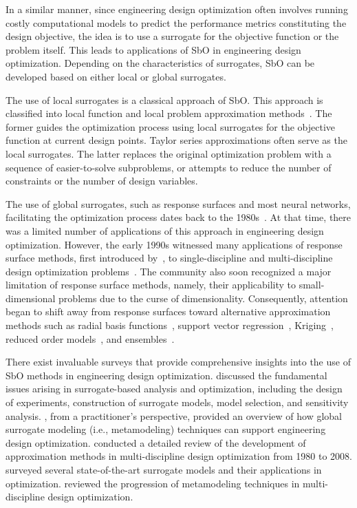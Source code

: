 \documentclass[journal ]{new-aiaa}
\begin{document}
	In a similar manner, since engineering design optimization often involves running costly computational models to predict the performance metrics constituting the design objective, the idea is to use a surrogate for the objective function or the problem itself.
	This leads to applications of SbO in engineering design optimization.
	Depending on the characteristics of surrogates, SbO can be developed based on either local or global surrogates.
	
	The use of local surrogates is a classical approach of SbO.
	This approach is classified into local function and local problem approximation methods~\citep{Barthelemy1993}.
	The former guides the optimization process using local surrogates for the objective function at current design points.
	Taylor series approximations often serve as the local surrogates.
	The latter replaces the original optimization problem with a sequence of easier-to-solve subproblems, or attempts to reduce the number of constraints or the number of design variables.
	
	The use of global surrogates, such as response surfaces and most neural networks, facilitating the optimization process dates back to the 1980s~\citep{Barthelemy1993}.
	At that time, there was a limited number of applications of this approach in engineering design optimization.
	However, the early 1990s witnessed many applications of response surface methods, first introduced by~\citet{Box1951}, to single-discipline and multi-discipline design optimization problems~\citep{Sobieski1997}.
	The community also soon recognized a major limitation of response surface methods, namely, their applicability to small-dimensional problems due to the curse of dimensionality.
	Consequently, attention began to shift away from response surfaces toward alternative approximation methods such as radial basis functions~\citep{Hussain2002}, support vector regression~\citep{Girosi1998}, Kriging~\citep{Cressie1990,Kleijnen2009}, reduced order models~\citep{Antoulas2005}, and ensembles~\citep{Goel2007,LiuH2020}. 
	
	There exist invaluable surveys that provide comprehensive insights into the use of SbO methods in engineering design optimization.
	\citet{Queipo2005} discussed the fundamental issues arising in surrogate-based analysis and optimization, including the design of experiments, construction of surrogate models, model selection, and sensitivity analysis.
	\citet{Wang2006}, from a practitioner’s perspective, provided an overview of how global surrogate modeling (i.e., metamodeling) techniques can support engineering design optimization. 
	\citet{Simpson2008} conducted a detailed review of the development of approximation methods in multi-discipline design optimization from 1980 to 2008.
	\citet{Forrester2009} surveyed several state-of-the-art surrogate models and their applications in optimization.
	\citet{Viana2014} reviewed the progression of metamodeling techniques in multi-discipline design optimization.
	
\end{document}
